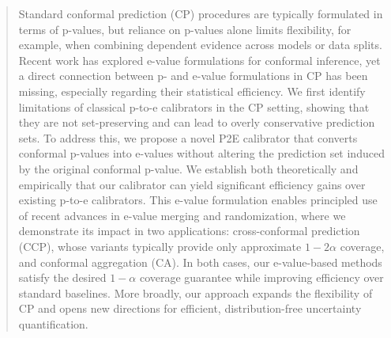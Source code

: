 \documentclass{article}
\theoremstyle{plain}
\theoremstyle{definition}
\theoremstyle{remark}
\begin{document}
\printAffiliationsAndNotice{}  %


\begin{abstract}




Standard conformal prediction (CP) procedures are typically formulated in terms of p-values, but reliance on p-values alone limits flexibility, for example, when combining dependent evidence across models or data splits. Recent work has explored e-value formulations for conformal inference, yet a direct connection between p- and e-value formulations in CP has been missing, especially regarding their statistical efficiency. We first identify limitations of classical p-to-e calibrators in the CP setting, showing that they are not set-preserving and can lead to overly conservative prediction sets. To address this, we propose a novel P2E calibrator that converts conformal p-values into e-values without altering the prediction set induced by the original conformal p-value.  We establish both theoretically and empirically that our calibrator can yield significant efficiency gains over existing p-to-e calibrators. This e-value formulation enables principled use of recent advances in e-value merging and randomization, where we demonstrate its impact in two applications: cross-conformal prediction (CCP), whose variants typically provide only approximate $1-2\alpha$ coverage, and conformal aggregation (CA). In both cases, our e-value-based methods satisfy the desired $1-\alpha$ coverage guarantee while improving efficiency over standard baselines. More broadly, our approach expands the flexibility of CP and opens new directions for efficient, distribution-free uncertainty quantification.

 
 

\end{abstract}
\end{document}
